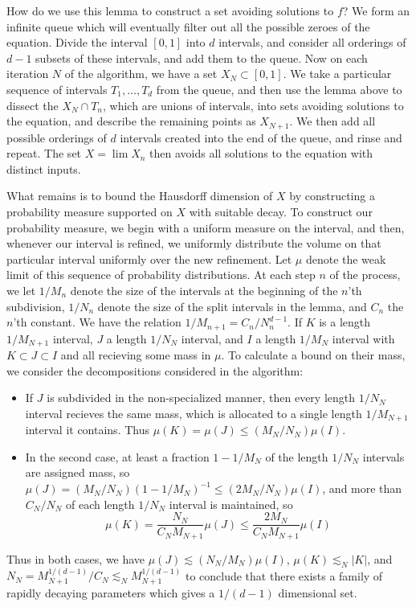 \documentclass{report}
\theoremstyle{plain}
\theoremstyle{plain}
\begin{document}
How do we use this lemma to construct a set avoiding solutions to $f$? We form an infinite queue which will eventually filter out all the possible zeroes of the equation. Divide the interval $[0,1]$ into $d$ intervals, and consider all orderings of $d - 1$ subsets of these intervals, and add them to the queue. Now on each iteration $N$ of the algorithm, we have a set $X_N \subset [0,1]$. We take a particular sequence of intervals $T_1, \dots, T_d$ from the queue, and then use the lemma above to dissect the $X_N \cap T_n$, which are unions of intervals, into sets avoiding solutions to the equation, and describe the remaining points as $X_{N+1}$. We then add all possible orderings of $d$ intervals created into the end of the queue, and rinse and repeat. The set $X = \lim X_n$ then avoids all solutions to the equation with distinct inputs.

What remains is to bound the Hausdorff dimension of $X$ by constructing a probability measure supported on $X$ with suitable decay. To construct our probability measure, we begin with a uniform measure on the interval, and then, whenever our interval is refined, we uniformly distribute the volume on that particular interval uniformly over the new refinement. Let $\mu$ denote the weak limit of this sequence of probability distributions. At each step $n$ of the process, we let $1/M_n$ denote the size of the intervals at the beginning of the $n$'th subdivision, $1/N_n$ denote the size of the split intervals in the lemma, and $C_n$ the $n$'th constant. We have the relation $1/M_{n+1} = C_n/N_n^{d-1}$. If $K$ is a length $1/M_{N+1}$ interval, $J$ a length $1/N_N$ interval, and $I$ a length $1/M_N$ interval with $K \subset J \subset I$ and all recieving some mass in $\mu$. To calculate a bound on their mass, we consider the decompositions considered in the algorithm:
%
\begin{itemize}
        \item If $J$ is subdivided in the non-specialized manner, then every length $1/N_N$ interval recieves the same mass, which is allocated to a single length $1/M_{N+1}$ interval it contains. Thus $\mu(K) = \mu(J) \leq (M_N/N_N) \mu(I)$.
        \item In the second case, at least a fraction $1 - 1/M_N$ of the length $1/N_N$ intervals are assigned mass, so $\mu(J) = (M_N/N_N)(1 - 1/M_N)^{-1} \leq (2M_N/N_N) \mu(I)$, and more than $C_N/N_N$ of each length $1/N_N$ interval is maintained, so
        \[ \mu(K) = \frac{N_N}{C_NM_{N+1}} \mu(J) \leq \frac{2M_N}{C_NM_{N+1}} \mu(I) \]
\end{itemize}
%
Thus in both cases, we have $\mu(J) \lesssim (N_N/M_N) \mu(I)$, $\mu(K) \lesssim_N |K|$, and $N_N = M_{N+1}^{1/(d-1)}/C_N \lesssim_N M_{N+1}^{1/(d-1)}$ to conclude that there exists a family of rapidly decaying parameters which gives a $1/(d-1)$ dimensional set.
\end{document}
